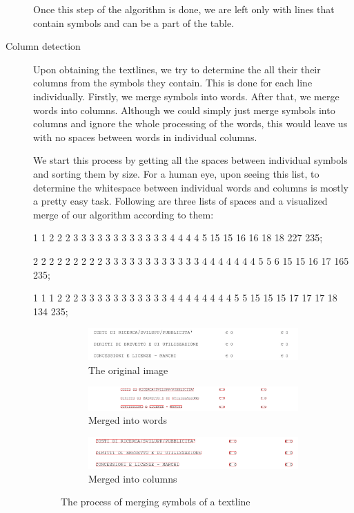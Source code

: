 \begin{description}
Once this step of the algorithm is done, we are left only with lines that contain symbols and can be a part of the table.

\item[Column detection]
Upon obtaining the textlines, we try to determine the all their their columns from the symbols they contain. This is done for each line individually. Firstly, we merge symbols into words. After that, we merge words into columns. Although we could simply just merge symbols into columns and ignore the whole processing of the words, this would leave us with no spaces between words in individual columns.

We start this process by getting all the spaces between individual symbols and sorting them by size. For a human eye, upon seeing this list, to determine the whitespace between individual words and columns is mostly a pretty easy task. Following are three lists of spaces and a visualized merge of our algorithm according to them:

\texttt{}{
1 1 2 2 2 3 3 3 3 3 3 3 3 3 3 3 3 4 4 4 4 5 15 15 16 16 18 18 227 235;

2 2 2 2 2 2 2 2 2 3 3 3 3 3 3 3 3 3 3 3 3 4 4 4 4 4 4 4 5 5 6 15 15 16 17 165 235;

1 1 1 2 2 2 3 3 3 3 3 3 3 3 3 3 3 4 4 4 4 4 4 4 4 5 5 15 15 15 17 17 17 18 134 235;}

\begin{figure}[H]
\hspace*{\fill} %
\begin{subfigure}{0.80\textwidth}
\includegraphics[width=\linewidth]{img/implementation/mergedOrig.jpg}
\caption{The original image} \label{fig:1b}
\end{subfigure}
\begin{subfigure}{0.80\textwidth}
\includegraphics[width=\linewidth]{img/implementation/mergedWords.png}
\caption{Merged into words} \label{fig:1c}
\end{subfigure}
\hspace*{\fill} %
\begin{subfigure}{0.80\textwidth}
\includegraphics[width=\linewidth]{img/implementation/mergedCols.png}
\caption{Merged into columns} \label{fig:1c}
\end{subfigure}
\caption{The process of merging symbols of a textline} \label{fig:1}
\end{figure}


\end{description}
